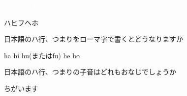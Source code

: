 \documentclass[aspectratio=169, xcolor={dvipsnames,table}]{beamer}
\begin{document}
\begin{frame}
  \centering
  \textcolor{white}{\Huge\bfseries Today's Pronunciation}\pause

  \vspace{30pt}

  \textcolor{white}{\Huge\bfseries {}}
  \vfill

  \hfill\hyperlink{ex}{}
\end{frame}
\begin{frame}[plain]{ハヒフヘホ}
  \begin{description}
    \item<1->[Question 1] 日本語のハ行、つまりをローマ字で書くとどうなりますか

    \item<2->[Answer 1] ha\hspace{10pt} hi\hspace{10pt} hu(またはfu)\hspace{10pt} he\hspace{10pt}
          ho
  \end{description}

  \bigskip

  \begin{description}
    \item<3->[Question 2] 日本語のハ行、つまりの子音はどれもおなじでしょうか

    \item<4->[Answer 2] ちがいます\\
  \end{description}

  \bigskip

  \hfill{}
\end{frame}
\end{document}
